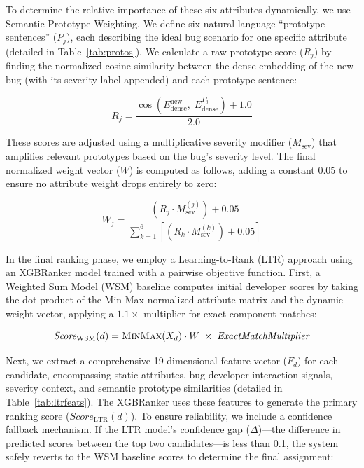 \documentclass[sigconf,review,anonymous]{acmart}
\begin{document}
To determine the relative importance of these six attributes dynamically, we use Semantic Prototype Weighting. We define six natural language ``prototype sentences'' ($P_j$), each describing the ideal bug scenario for one specific attribute (detailed in Table~\ref{tab:protos}). We calculate a raw prototype score ($R_j$) by finding the normalized cosine similarity between the dense embedding of the new bug (with its severity label appended) and each prototype sentence:

\begin{equation}
R_j = \frac{\cos\!\left(E^{\text{new}}_{\text{dense}},\;E^{P_j}_{\text{dense}}\right) + 1.0}{2.0}
\label{eq:proto_score}
\end{equation}

These scores are adjusted using a multiplicative severity modifier ($M_{\text{sev}}$) that amplifies relevant prototypes based on the bug's severity level. The final normalized weight vector ($W$) is computed as follows, adding a constant $0.05$ to ensure no attribute weight drops entirely to zero:

\begin{equation}
W_j = \frac{\left(R_j \cdot M^{(j)}_{\text{sev}}\right) + 0.05}{\displaystyle\sum_{k=1}^{6}\left[\left(R_k \cdot M^{(k)}_{\text{sev}}\right) + 0.05\right]}
\label{eq:weights}
\end{equation}

In the final ranking phase, we employ a Learning-to-Rank (LTR) approach using an XGBRanker model trained with a pairwise objective function. First, a Weighted Sum Model (WSM) baseline computes initial developer scores by taking the dot product of the Min-Max normalized attribute matrix and the dynamic weight vector, applying a $1.1\times$ multiplier for exact component matches:

\begin{equation}
\textit{Score}_{\text{WSM}}(d) = \textsc{MinMax}(X_d) \cdot W \;\times\; \textit{ExactMatchMultiplier}
\end{equation}

Next, we extract a comprehensive 19-dimensional feature vector ($F_d$) for each candidate, encompassing static attributes, bug-developer interaction signals, severity context, and semantic prototype similarities (detailed in Table~\ref{tab:ltrfeats}). The XGBRanker uses these features to generate the primary ranking score ($\textit{Score}_{\text{LTR}}(d)$). To ensure reliability, we include a confidence fallback mechanism. If the LTR model's confidence gap ($\Delta$)—the difference in predicted scores between the top two candidates—is less than 0.1, the system safely reverts to the WSM baseline scores to determine the final assignment:
\end{document}
